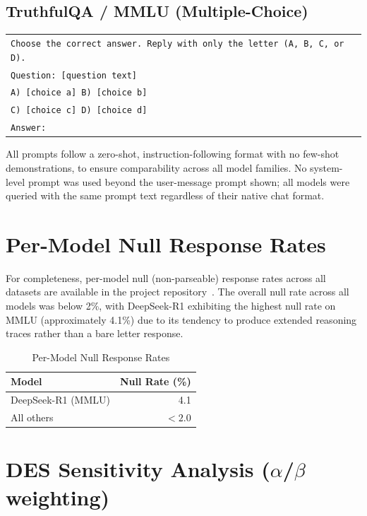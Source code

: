 \documentclass[journal]{IEEEtran}
\begin{document}
\subsection{TruthfulQA / MMLU (Multiple-Choice)}
\begin{center}\small\begin{tabular}{p{}}
\hline
\texttt{Choose the correct answer. Reply with only the letter (A, B, C, or D).}\\[4pt]
\texttt{Question: [question text]}\\
\texttt{A) [choice a]  B) [choice b]}\\
\texttt{C) [choice c]  D) [choice d]}\\[4pt]
\texttt{Answer:}\\
\hline
\end{tabular}\end{center}

All prompts follow a zero-shot, instruction-following format with no
few-shot demonstrations, to ensure comparability across all model families.
No system-level prompt was used beyond the user-message prompt shown;
all models were queried with the same prompt text regardless of their
native chat format.

\section{Per-Model Null Response Rates}
\label{app:null}

For completeness, per-model null (non-parseable) response rates across
all datasets are available in the project
repository~\cite{desrepo2025}.
The overall null rate across all models was below 2\%, with DeepSeek-R1
exhibiting the highest null rate on MMLU (approximately 4.1\%) due to
its tendency to produce extended reasoning traces rather than a bare
letter response.

\begin{table}[h]
  \centering
  \caption{Per-Model Null Response Rates}
  \label{tab:null_rates}
  \begin{tabular}{lr}
    \toprule
    Model & Null Rate (\%) \\
    \midrule
    DeepSeek-R1 (MMLU) & 4.1 \\
    All others & $<2.0$ \\
    \bottomrule
  \end{tabular}
\end{table}

\section{DES Sensitivity Analysis (\texorpdfstring{$\alpha$}{alpha}/\texorpdfstring{$\beta$}{beta} weighting)}
\label{app:sensitivity}
\end{document}
